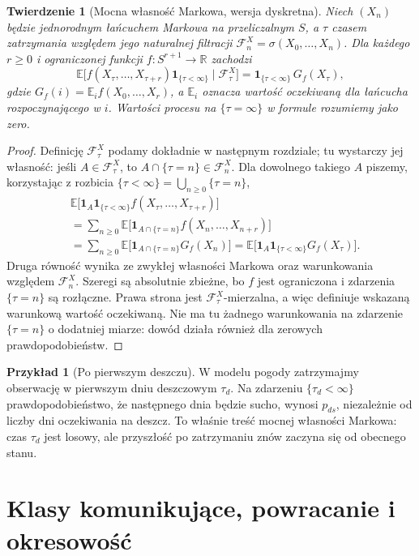 \documentclass[11pt,a4paper,oneside]{report}
\numberwithin{equation}{chapter}
\theoremstyle{plain}
\newtheorem{twierdzenie}{Twierdzenie}[chapter]
\theoremstyle{definition}
\newtheorem{przyklad}{Przykład}[chapter]
\theoremstyle{remark}
\newcommand{\R}{\mathbb{R}}
\newcommand{\E}{\mathbb{E}}
\newcommand{\ind}[1]{\mathbf{1}_{#1}}
\begin{document}
\begin{twierdzenie}[Mocna własność Markowa, wersja dyskretna]
Niech $(X_n)$ będzie jednorodnym łańcuchem Markowa
na przeliczalnym $S$, a $\tau$ czasem zatrzymania
względem jego naturalnej filtracji
$\mathcal F_n^X=\sigma(X_0,\ldots,X_n)$.
Dla każdego $r\geq0$ i ograniczonej funkcji
$f:S^{r+1}\to\R$ zachodzi
\[
\E\bigl[f(X_\tau,\ldots,X_{\tau+r})
\ind{\{\tau<\infty\}}\mid\mathcal F_\tau^X\bigr]
=\ind{\{\tau<\infty\}}\,G_f(X_\tau),
\]
gdzie $G_f(i)=\E_i f(X_0,\ldots,X_r)$, a
$\E_i$ oznacza wartość oczekiwaną dla łańcucha
rozpoczynającego w $i$. Wartości procesu na
$\{\tau=\infty\}$ w formule rozumiemy jako zero.
\end{twierdzenie}
\begin{proof}
Definicję $\mathcal F_\tau^X$ podamy dokładnie
w następnym rozdziale; tu wystarczy jej własność:
jeśli $A\in\mathcal F_\tau^X$, to
$A\cap\{\tau=n\}\in\mathcal F_n^X$.
Dla dowolnego takiego $A$ piszemy, korzystając
z rozbicia $\{\tau<\infty\}=\bigcup_{n\geq0}\{\tau=n\}$,
\begin{align*}
&\E\bigl[\ind A\ind{\{\tau<\infty\}}
 f(X_\tau,\ldots,X_{\tau+r})\bigr]\\
&=\sum_{n\geq0}\E\bigl[
\ind{A\cap\{\tau=n\}}f(X_n,\ldots,X_{n+r})\bigr]\\
&=\sum_{n\geq0}\E\bigl[
\ind{A\cap\{\tau=n\}}G_f(X_n)\bigr]
=\E\bigl[\ind A\ind{\{\tau<\infty\}}G_f(X_\tau)\bigr].
\end{align*}
Druga równość wynika ze zwykłej własności Markowa
oraz warunkowania względem $\mathcal F_n^X$.
Szeregi są absolutnie zbieżne, bo $f$ jest ograniczona
i zdarzenia $\{\tau=n\}$ są rozłączne.
Prawa strona jest $\mathcal F_\tau^X$-mierzalna,
a więc definiuje wskazaną warunkową wartość
oczekiwaną. Nie ma tu żadnego warunkowania
na zdarzenie $\{\tau=n\}$ o dodatniej miarze:
dowód działa również dla zerowych prawdopodobieństw.
\end{proof}

\begin{przyklad}[Po pierwszym deszczu]
W modelu pogody zatrzymajmy obserwację w pierwszym
dniu deszczowym $\tau_d$. Na zdarzeniu
$\{\tau_d<\infty\}$ prawdopodobieństwo, że
następnego dnia będzie sucho, wynosi $p_{ds}$,
niezależnie od liczby dni oczekiwania na deszcz.
To właśnie treść mocnej własności Markowa:
czas $\tau_d$ jest losowy, ale przyszłość po
zatrzymaniu znów zaczyna się od obecnego stanu.
\end{przyklad}

\section{Klasy komunikujące, powracanie i okresowość}
\end{document}
